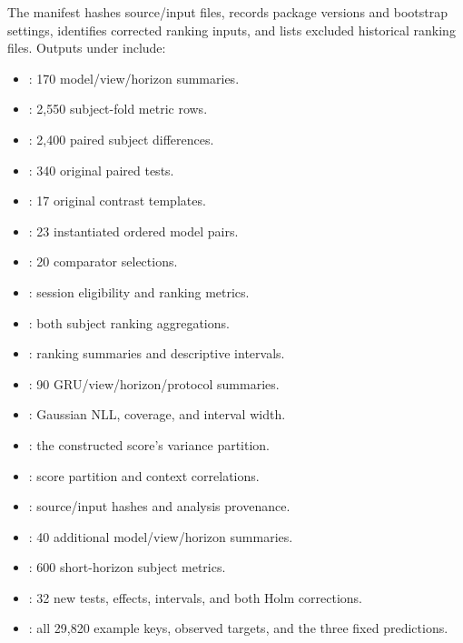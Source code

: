 \documentclass[a4paper,10pt,onecolumn]{IEEEtran}
\begin{document}
The manifest hashes source/input files, records package versions and bootstrap
settings, identifies corrected ranking inputs, and lists excluded historical
ranking files. Outputs under
 include:
\begin{itemize}
\item {}: 170 model/view/horizon summaries.
\item {}: 2,550 subject-fold metric rows.
\item {}: 2,400 paired subject differences.
\item {}: 340 original paired tests.
\item {}: 17 original contrast templates.
\item {}: 23 instantiated ordered model pairs.
\item {}: 20 comparator selections.
\item {}: session eligibility and ranking metrics.
\item {}: both subject ranking aggregations.
\item {}: ranking summaries and descriptive intervals.
\item {}: 90 GRU/view/horizon/protocol summaries.
\item {}: Gaussian NLL, coverage, and interval width.
\item {}: the constructed score's variance partition.
\item {}: score partition and context correlations.
\item {}: source/input hashes and analysis provenance.
\item {}: 40 additional model/view/horizon summaries.
\item {}: 600 short-horizon subject metrics.
\item {}: 32 new tests, effects, intervals,
and both Holm corrections.
\item {}: all 29,820 example keys,
observed targets, and the three fixed predictions.

\end{itemize}
\end{document}
